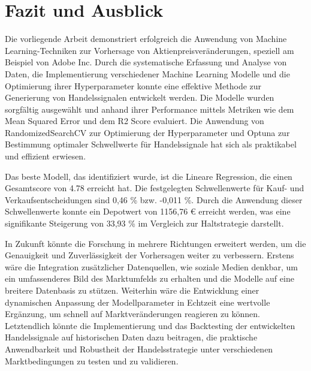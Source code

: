 \section{Fazit und Ausblick}\label{sec:Fazit und Ausblick}
Die vorliegende Arbeit demonstriert erfolgreich die Anwendung von Machine Learning-Techniken zur Vorhersage von Aktienpreisveränderungen, speziell am Beispiel von Adobe Inc. Durch die systematische Erfassung und Analyse von Daten, die Implementierung verschiedener Machine Learning Modelle und die Optimierung ihrer Hyperparameter konnte eine effektive Methode zur Generierung von Handelssignalen entwickelt werden. Die Modelle wurden sorgfältig ausgewählt und anhand ihrer Performance mittels Metriken wie dem Mean Squared Error und dem R2 Score evaluiert. Die Anwendung von RandomizedSearchCV zur Optimierung der Hyperparameter und Optuna zur Bestimmung optimaler Schwellwerte für Handelssignale hat sich als praktikabel und effizient erwiesen.
\par
Das beste Modell, das identifiziert wurde, ist die Lineare Regression, die einen Gesamtscore von 4.78 erreicht hat. Die festgelegten Schwellenwerte für Kauf- und Verkaufsentscheidungen sind 0,46 \% bzw. -0,011 \%. Durch die Anwendung dieser Schwellenwerte konnte ein Depotwert von 1156,76 € erreicht werden, was eine signifikante Steigerung von 33,93 \% im Vergleich zur Haltstrategie darstellt.
\par
In Zukunft könnte die Forschung in mehrere Richtungen erweitert werden, um die Genauigkeit und Zuverlässigkeit der Vorhersagen weiter zu verbessern. Erstens wäre die Integration zusätzlicher Datenquellen, wie soziale Medien denkbar, um ein umfassenderes Bild des Marktumfelds zu erhalten und die Modelle auf eine breitere Datenbasis zu stützen. Weiterhin wäre die Entwicklung einer dynamischen Anpassung der Modellparameter in Echtzeit eine wertvolle Ergänzung, um schnell auf Marktveränderungen reagieren zu können. Letztendlich könnte die Implementierung und das Backtesting der entwickelten Handelssignale auf historischen Daten dazu beitragen, die praktische Anwendbarkeit und Robustheit der Handelsstrategie unter verschiedenen Marktbedingungen zu testen und zu validieren.